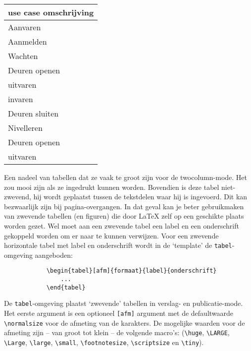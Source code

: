 	
	\begin{center}
		\begin{tabular}{|l||r|}
			\hline
			\multicolumn{2}{|c|}{use case omschrijving}\\
			\hline
			Aanvaren     & \the\paperwidth\\
			Aanmelden      & \the\textwidth\\
			Wachten    & \the\columnwidth\\
			Deuren openen & \the\columnsep\\
			uitvaren  & \the\oddsidemargin\\
			invaren & \the\evensidemargin\\
			Deuren sluiten    & \the\paperheight\\
			Nivelleren     & \the\textheight\\
			Deuren openen & \the\columnsep\\
			uitvaren  & \the\oddsidemargin\\
			
			\hline
		\end{tabular}
	\end{center}
	
	Een nadeel van tabellen dat ze vaak te groot zijn voor de
	twocolumn-mode. Het zou mooi zijn als ze ingedrukt kunnen
	worden. Bovendien is deze tabel niet-zwevend, hij wordt geplaatst
	tussen de tekstdelen waar hij is ingevoerd. Dit kan bezwaarlijk zijn
	bij pagina-overgangen. In dat geval kan je beter gebruikmaken van
	zwevende tabellen (en figuren) die door \LaTeX{} zelf op een geschikte
	plaats worden gezet. Wel moet aan een zwevende tabel een label en een
	onderschrift gekoppeld worden om er naar te kunnen verwijzen. Voor een
	zwevende horizontale tabel met label en onderschrift wordt in de
	`template' de \verb!tabel!-omgeving aangeboden:\\
	
	\begin{Aanpassen}
		\begin{verbatim}
			\begin{tabel}[afm]{formaat}{label}{onderschrift}
				...
			\end{tabel}
		\end{verbatim}
	\end{Aanpassen}
	
	
	De \verb!tabel!-omgeving plaatst `zwevende' tabellen in verslag- en
	publicatie-mode. Het eerste argument is een optioneel \verb![afm]!
	argument met de defaultwaarde \verb!\normalsize! voor de afmeting van
	de karakters. De mogelijke waarden voor de afmeting zijn -- van groot
	tot klein -- de volgende macro's: (\verb!\huge!, \verb!\LARGE!,
	\verb!\Large!, \verb!\large!, \verb!\small!, \verb!\footnotesize!,
	\verb!\scriptsize! en \verb!\tiny!).
	
